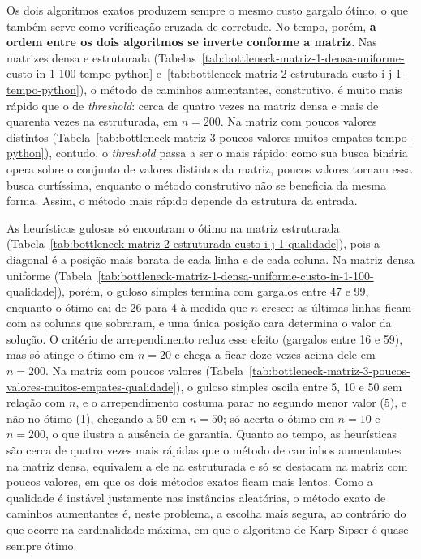 






Os dois algoritmos exatos produzem sempre o mesmo custo gargalo ótimo, o que também
serve como verificação cruzada de corretude. No tempo, porém, \textbf{a ordem entre os dois algoritmos se inverte conforme
a matriz}. Nas matrizes densa e estruturada
(Tabelas~\ref{tab:bottleneck-matriz-1-densa-uniforme-custo-in-1-100-tempo-python}
e~\ref{tab:bottleneck-matriz-2-estruturada-custo-i-j-1-tempo-python}), o método de
caminhos aumentantes, construtivo, é muito mais rápido que o de
\textit{threshold}: cerca de quatro vezes na matriz densa e mais de quarenta vezes
na estruturada, em $n = 200$. Na matriz com poucos valores distintos
(Tabela~\ref{tab:bottleneck-matriz-3-poucos-valores-muitos-empates-tempo-python}),
contudo, o \textit{threshold} passa a ser o mais rápido: como sua busca binária
opera sobre o conjunto de valores distintos da matriz, poucos valores tornam essa
busca curtíssima, enquanto o método construtivo não se beneficia da mesma forma.
Assim, o método mais rápido depende da estrutura da entrada.

As heurísticas gulosas só encontram o ótimo na matriz estruturada
(Tabela~\ref{tab:bottleneck-matriz-2-estruturada-custo-i-j-1-qualidade}), pois a diagonal é a posição mais barata de cada linha e de cada
coluna. Na matriz densa uniforme
(Tabela~\ref{tab:bottleneck-matriz-1-densa-uniforme-custo-in-1-100-qualidade}),
porém, o guloso simples termina com gargalos entre 47 e 99, enquanto o ótimo cai
de 26 para 4 à medida que $n$ cresce: as últimas linhas ficam com as colunas que
sobraram, e uma única posição cara determina o valor da solução. O critério de
arrependimento reduz esse efeito (gargalos entre 16 e 59), mas só atinge o ótimo
em $n = 20$ e chega a ficar doze vezes acima dele em $n = 200$. Na matriz com
poucos valores
(Tabela~\ref{tab:bottleneck-matriz-3-poucos-valores-muitos-empates-qualidade}), o
guloso simples oscila entre 5, 10 e 50 sem relação com $n$, e o arrependimento
costuma parar no segundo menor valor (5), e não no ótimo (1), chegando a 50 em
$n = 50$; só acerta o ótimo em $n = 10$ e $n = 200$, o que ilustra a ausência de
garantia. Quanto ao tempo, as heurísticas são
cerca de quatro vezes mais rápidas que o método de caminhos aumentantes na matriz
densa, equivalem a ele na estruturada e só se destacam na matriz com poucos
valores, em que os dois métodos exatos ficam mais lentos. Como a qualidade é
instável justamente nas instâncias aleatórias, o método exato de caminhos
aumentantes é, neste problema, a escolha mais segura, ao contrário do que ocorre
na cardinalidade máxima, em que o algoritmo de Karp-Sipser é quase sempre ótimo.

